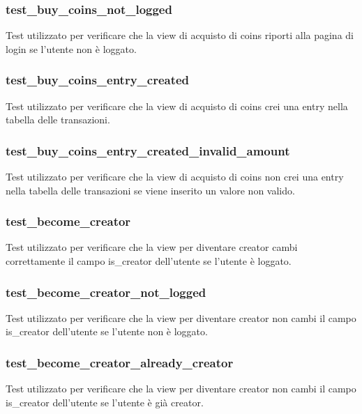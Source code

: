\subsubsection{test\_buy\_coins\_not\_logged}
Test utilizzato per verificare che la view di acquisto di coins riporti alla pagina di login se l'utente non è loggato.

\subsubsection{test\_buy\_coins\_entry\_created}
Test utilizzato per verificare che la view di acquisto di coins crei una entry nella tabella delle transazioni.

\subsubsection{test\_buy\_coins\_entry\_created\_invalid\_amount}
Test utilizzato per verificare che la view di acquisto di coins non crei una entry nella tabella delle transazioni se viene inserito un valore non valido.

\subsubsection{test\_become\_creator}
Test utilizzato per verificare che la view per diventare creator cambi correttamente il campo is\_creator dell'utente se l'utente è loggato.

\subsubsection{test\_become\_creator\_not\_logged}
Test utilizzato per verificare che la view per diventare creator non cambi il campo is\_creator dell'utente se l'utente non è loggato.

\subsubsection{test\_become\_creator\_already\_creator}
Test utilizzato per verificare che la view per diventare creator non cambi il campo is\_creator dell'utente se l'utente è già creator.